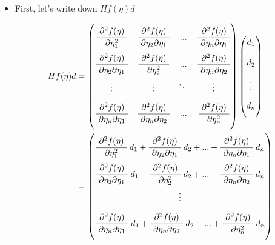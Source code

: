 \documentclass[]{article}
\begin{document}
\begin{itemize} \item[] 
First, let's write down $Hf(\eta)d$ 

 \begin{align}
     Hf(\eta)d &= \begin{pmatrix} \\[-.85em]
     \cfrac{ \ \partial^2 f(\eta) \ }{ \partial \eta_1^2} & \cfrac{ \ \partial^2 f(\eta) \ }{ \ \partial \eta_2 \partial \eta_1 \ } & ... & \cfrac{ \ \partial^2 f(\eta) \ }{ \ \partial \eta_n \partial \eta_1 \ } \\[1.25em]
     \cfrac{ \ \partial^2 f(\eta) \ }{ \ \partial \eta_2 \partial \eta_1 \ } & \cfrac{ \ \partial^2 f(\eta) \ }{ \ \partial \eta_2^2   \ } & ... & \cfrac{ \ \partial^2 f(\eta) \ }{ \ \partial \eta_n \partial \eta_2 \ } \\[1em]
     \vdots & \vdots & \ddots & \vdots \\[1em]
    \cfrac{ \ \partial^2 f(\eta) \ }{ \ \partial \eta_n \partial \eta_1 \ } & \cfrac{ \ \partial^2 f(\eta) \ }{ \ \partial \eta_n \partial \eta_2   \ } & ... & \cfrac{ \ \partial^2 f(\eta) \ }{ \ \partial \eta^2_n \ } \\[1.25em]
     \end{pmatrix} \begin{pmatrix} \\[-.85em] d_1     \\[1.25em] d_2  \\[1em] \vdots  \\[1em] d_n  \\[.85em]  \end{pmatrix} \\
     &= \begin{pmatrix} \\[-.85em]
     \cfrac{ \ \partial^2 f(\eta) \ }{ \partial \eta_1^2} \ d_1 + \cfrac{ \ \partial^2 f(\eta) \ }{ \ \partial \eta_2 \partial \eta_1 \ } \ d_2 + ... + \cfrac{ \ \partial^2 f(\eta) \ }{ \ \partial \eta_n \partial \eta_1 \ } \ d_n \\[1.25em]
     \cfrac{ \ \partial^2 f(\eta) \ }{ \ \partial \eta_2 \partial \eta_1 \ } \ d_1 + \cfrac{ \ \partial^2 f(\eta) \ }{ \ \partial \eta_2^2   \ } \ d_2  + ... + \cfrac{ \ \partial^2 f(\eta) \ }{ \ \partial \eta_n \partial \eta_2 \ } \ d_n \\[1em]
    \vdots \\[1em]
    \cfrac{ \ \partial^2 f(\eta) \ }{ \ \partial \eta_n \partial \eta_1 \ } \ d_1 + \cfrac{ \ \partial^2 f(\eta) \ }{ \ \partial \eta_n \partial \eta_2   \ } \ d_2 + ... + \cfrac{ \ \partial^2 f(\eta) \ }{ \ \partial \eta^2_n \ } \ d_n \\[1.25em]

\end{pmatrix}
\end{align}
\end{itemize}
\end{document}
